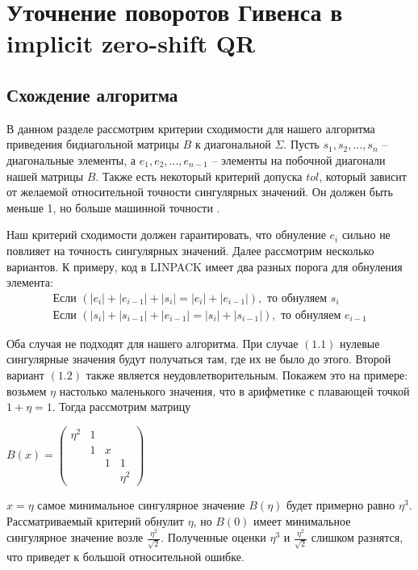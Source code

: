 \documentclass[12pt, a4paper]{report}
\theoremstyle{note}
\begin{document}
\tableofcontents

\chapter{Уточнение поворотов Гивенса в implicit zero-shift QR}

\section{Схождение алгоритма}
В данном разделе рассмотрим критерии сходимости для нашего алгоритма приведения бидиагольной матрицы $B$ к диагональной $\Sigma$. Пусть $s_1, s_2,...,s_n$ \--- диагональные элементы, а $e_1, e_2, ..., e_{n-1}$ \--- элементы на побочной диагонали нашей матрицы $B$. Также есть некоторый критерий допуска $tol$, который зависит от желаемой относительной точности сингулярных значений. Он должен быть меньше 1, но больше машинной точности \epsilon.

Наш критерий сходимости должен гарантировать, что обнуление $e_i$ сильно не повлияет на точность сингулярных значений. Далее рассмотрим несколько вариантов. К примеру, код в LINPACK имеет два разных порога для обнуления элемента:
\begin{align}
\text{Если } (|e_i| + |e_{i-1}| + |s_i| = |e_i| + |e_{i-1}|), \text{ то обнуляем }s_i
\\\text{Если } (|s_i| + |s_{i-1}| + |e_{i-1}| = |s_i| + |s_{i-1}|), \text{ то обнуляем }e_{i-1}
\end{align}

Оба случая не подходят для нашего алгоритма. При случае $(1.1)$ нулевые сингулярные значения будут получаться там, где их не было до этого. Второй вариант $(1.2)$ также является неудовлетворительным. Покажем это на примере: возьмем $\eta$ настолько маленького значения, что в арифметике с плавающей точкой $1+\eta=1$. Тогда рассмотрим матрицу
\begin{center}
$B(x)=\begin{pmatrix}
    \eta^2&1&&\\
    &1&x\\
    &&1&1\\
    &&&\eta^2
\end{pmatrix}$
\end{center}

 $x=\eta$ самое минимальное сингулярное значение $B(\eta)$ будет примерно равно $\eta^3$. Рассматриваемый критерий обнулит $\eta$, но $B(0)$ имеет минимальное сингулярное значение возле $\frac{\eta^2}{\sqrt{2}}$. Полученные оценки $\eta^3$ и $\frac{\eta^2}{\sqrt{2}}$ слишком разнятся, что приведет к большой относительной ошибке.
\end{document}
